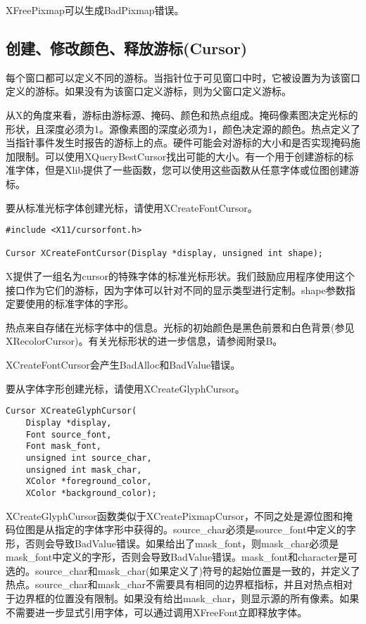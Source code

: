 XFreePixmap可以生成BadPixmap错误。

\subsection{创建、修改颜色、释放游标(Cursor)}

每个窗口都可以定义不同的游标。当指针位于可见窗口中时，它被设置为为该窗口定义的游标。如果没有为该窗口定义游标，则为父窗口定义游标。

从X的角度来看，游标由游标源、掩码、颜色和热点组成。掩码像素图决定光标的形状，且深度必须为1。源像素图的深度必须为1，颜色决定源的颜色。热点定义了当指针事件发生时报告的游标上的点。硬件可能会对游标的大小和是否实现掩码施加限制。可以使用XQueryBestCursor找出可能的大小。有一个用于创建游标的标准字体，但是Xlib提供了一些函数，您可以使用这些函数从任意字体或位图创建游标。

要从标准光标字体创建光标，请使用XCreateFontCursor。

\begin{lstlisting}
#include <X11/cursorfont.h>

Cursor XCreateFontCursor(Display *display, unsigned int shape);
\end{lstlisting}

X提供了一组名为cursor的特殊字体的标准光标形状。我们鼓励应用程序使用这个接口作为它们的游标，因为字体可以针对不同的显示类型进行定制。shape参数指定要使用的标准字体的字形。

热点来自存储在光标字体中的信息。光标的初始颜色是黑色前景和白色背景(参见XRecolorCursor)。有关光标形状的进一步信息，请参阅附录B。

XCreateFontCursor会产生BadAlloc和BadValue错误。

要从字体字形创建光标，请使用XCreateGlyphCursor。

\begin{lstlisting}
Cursor XCreateGlyphCursor(
	Display *display,
	Font source_font,
	Font mask_font,
	unsigned int source_char,
	unsigned int mask_char,
	XColor *foreground_color,
	XColor *background_color);
\end{lstlisting}

XCreateGlyphCursor函数类似于XCreatePixmapCursor，不同之处是源位图和掩码位图是从指定的字体字形中获得的。source\_char必须是source\_font中定义的字形，否则会导致BadValue错误。如果给出了mask\_font，则mask\_char必须是mask\_font中定义的字形，否则会导致BadValue错误。mask\_font和character是可选的。source\_char和mask\_char(如果定义了)符号的起始位置是一致的，并定义了热点。source\_char和mask\_char不需要具有相同的边界框指标，并且对热点相对于边界框的位置没有限制。如果没有给出mask\_char，则显示源的所有像素。如果不需要进一步显式引用字体，可以通过调用XFreeFont立即释放字体。

